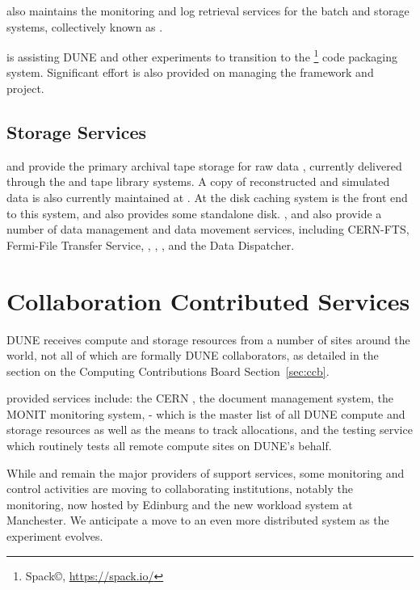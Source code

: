 \documentclass[../main-v1.tex]{subfiles}
\begin{document}
 also maintains
the monitoring and log retrieval services for the batch and storage systems, collectively known as . 

 is assisting DUNE and other experiments to transition to the \footnote{Spack\copyright, \url{https://spack.io/}} code packaging system.  Significant effort is also provided on managing the  framework and  project.

\subsection{Storage Services}
 and  provide the primary archival tape storage for raw data , currently delivered through the  and   tape library systems. A copy of reconstructed and simulated data is also currently maintained at . At  the  
disk caching system is the front end to this system, and also provides some standalone disk.  ,  and  also provide a number of data management and data movement services, including CERN-FTS, Fermi-File Transfer Service, , , , and the Data Dispatcher. 



\section{Collaboration Contributed Services}
DUNE receives compute and storage resources from a number of sites around the world, not all of which are formally DUNE collaborators,  as detailed in the section on the Computing Contributions Board 
Section~\ref{sec:ccb}.

 provided services include: the CERN ,  the  document
management system, the MONIT monitoring system,   - which is the master list of all DUNE compute and storage resources as well as the means to track allocations,  and the  testing service which routinely tests all remote compute sites on DUNE's behalf. %

While  and  remain the major providers of support services, some monitoring and control activities are moving to collaborating institutions, notably the  monitoring, now hosted by Edinburg and the new workload system at Manchester.  We anticipate a move to an even more distributed system as the experiment evolves. 
\end{document}
